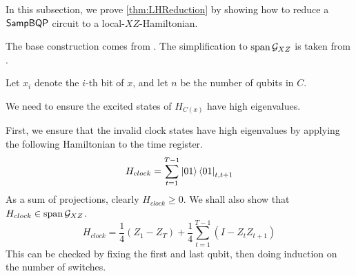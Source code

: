 


In this subsection, we prove \cref{thm:LHReduction} by showing how to reduce a $\operatorname{\mathsf{SampBQP}}$ circuit to a local-$XZ$-Hamiltonian.

	The base construction comes from \cite{kitaev2002classical}. The simplification to $\operatorname*{\operatorname{span}}\mathcal{G}_{XZ}$ is taken from \cite{PhysRevA.78.012352}.

	Let $x_i$ denote the $i$-th bit of $x$, and let $n$ be the number of qubits in $C$.

	We need to ensure the excited states of $H_{C(x)}$ have high eigenvalues.

	First, we ensure that the invalid clock states have high eigenvalues by applying the following Hamiltonian to the time register.
	$$H_{clock}=\sum_{t=1}^{T-1}\ket{01}\bra{01}_{t,t+1}$$
	As a sum of projections, clearly $H_{clock}\geq 0$. We shall also show that $H_{clock}\in\operatorname*{\operatorname{span}}\mathcal{G}_{XZ}$.
	$$H_{clock}=\frac{1}{4}(Z_1 - Z_T) + \frac{1}{4}\sum_{t=1}^{T-1}(I-Z_tZ_{t+1}) $$
	This can be checked by fixing the first and last qubit, then doing induction on the number of switches.

